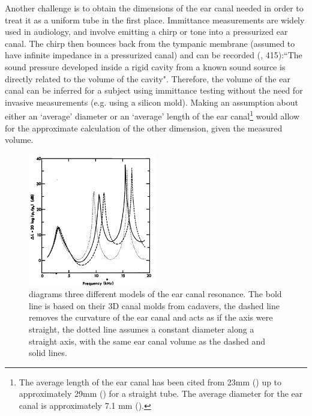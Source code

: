 \documentclass[dissertation,copyright]{uathesis}
\begin{document}
Another challenge is to obtain the dimensions of the ear canal needed in order to treat it as a uniform tube in the first place. Immittance measurements are widely used in audiology, and involve emitting a chirp or tone into a pressurized ear canal.  The chirp then bounces back from the tympanic membrane (assumed to have infinite impedance in a pressurized canal) and can be recorded (\cite{ballachanda:97}, 415):``The sound pressure developed inside a rigid cavity from a known sound source is directly related to the volume of the cavity".  Therefore, the volume of the ear canal can be inferred for a subject using immittance testing without the need for invasive measurements (e.g. using a silicon mold).  Making an assumption about either an `average' diameter or an `average' length of the ear canal\footnote{The average length of the ear canal has been cited from 23mm (\cite{rosen:91}) up to approximately 29mm (\cite{stinson:89}) for a straight tube. The average diameter for the ear canal is approximately 7.1 mm (\cite{salvinelli:91}).}  would allow for the approximate calculation of the other dimension, given the measured volume. 

\begin{figure}
\centering
  \includegraphics[width=0.5\textwidth]{figure/eac_mod_diffs.png}
  \caption{\cite{stinson:89} diagrams three different models of the ear canal resonance.  The bold line is based on their 3D canal molds from cadavers, the dashed line removes the curvature of the ear canal and acts as if the axis were straight, the dotted line assumes a constant diameter along a straight axis, with the same ear canal volume as the dashed and solid lines.}
  \label{fig:eac_modelling}
\end{figure}
\end{document}
